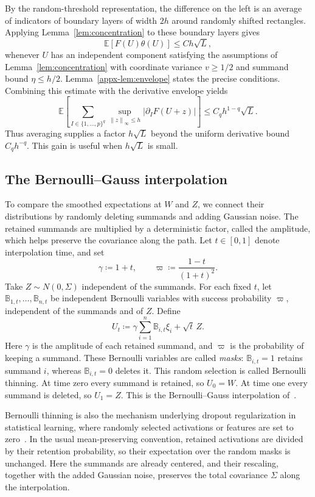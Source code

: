 \documentclass[11pt,letterpaper]{article}
\theoremstyle{remark}
\newcommand{\E}{\mathbb E}
\newcommand{\norm}[1]{\left\lVert#1\right\rVert}
\begin{document}
By the random-threshold representation, the difference on the left
is an average of indicators of boundary layers of width \(2h\)
around randomly shifted rectangles. Applying
Lemma~\ref{lem:concentration} to these boundary layers gives
\[
 \E[F(U)\theta(U)]\le Ch\sqrt L,
\]
whenever \(U\) has an independent component satisfying the
assumptions of Lemma~\ref{lem:concentration} with coordinate variance
\(v\ge1/2\) and summand bound \(\eta\le h/2\).
Lemma~\ref{appx-lem:envelope} states the precise conditions.
Combining this estimate with the derivative envelope yields
\[
 \E\!\left[\sum_{I\in\{1,\ldots,p\}^q}
 \sup_{\norm z_\infty\le h}|\partial_IF(U+z)|\right]
 \le C_qh^{1-q}\sqrt L.
\]
Thus averaging supplies a factor \(h\sqrt L\) beyond the uniform
derivative bound \(C_qh^{-q}\). This gain is useful when
\(h\sqrt L\) is small.

\subsection{The Bernoulli--Gauss interpolation}
\label{sec:outline-path}

To compare the smoothed expectations at \(W\) and \(Z\), we connect
their distributions by randomly deleting summands and adding Gaussian
noise. The retained summands are multiplied by a deterministic factor,
called the amplitude, which helps preserve the covariance along the
path. Let \(t\in[0,1]\) denote interpolation time, and set
\[
 \gamma\coloneqq 1+t,\qquad \varpi\coloneqq \frac{1-t}{(1+t)^2}.
\]
Take \(Z\sim N(0,\Sigma)\) independent of the summands. For each fixed
\(t\), let \(\mathbb B_{1,t},\ldots,\mathbb B_{n,t}\) be independent
Bernoulli variables with success probability \(\varpi\), independent
of the summands and of \(Z\). Define
\begin{equation}
 U_t\coloneqq \gamma\sum_{i=1}^n\mathbb B_{i,t}\xi_i+\sqrt{t}\,Z.
 \label{eq:path}
\end{equation}
Here \(\gamma\) is the amplitude of each retained summand, and
\(\varpi\) is the probability of keeping a summand. These Bernoulli
variables are called \emph{masks}: \(\mathbb B_{i,t}=1\) retains
summand \(i\), whereas \(\mathbb B_{i,t}=0\) deletes it. This random
selection is called Bernoulli thinning. At time zero every summand is retained, so
\(U_0=W\). At time one every summand is deleted, so \(U_1=Z\).
This is the Bernoulli--Gauss interpolation of~\cite[Section~4]{AL}.

Bernoulli thinning is also the mechanism underlying dropout
regularization in statistical learning, where randomly selected
activations or features are set to zero~\cite{Dropout2014}. In the
usual mean-preserving convention, retained activations are divided by
their retention probability, so their expectation over the random
masks is unchanged. Here the summands are already centered, and their
rescaling, together with the added Gaussian noise, preserves the total
covariance \(\Sigma\) along the interpolation.
\end{document}
